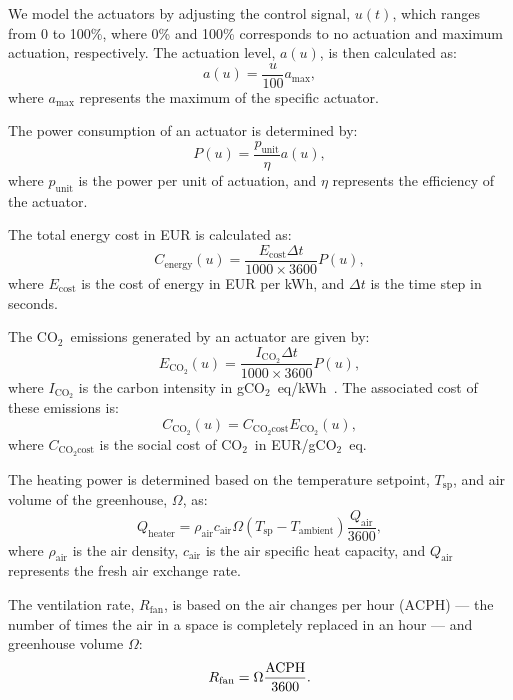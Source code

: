 \documentclass[conference]{IEEEtran}
\newcommand{\coo}{\ensuremath{\mathrm{CO_2}}}
\begin{document}
We model the actuators by adjusting the control signal, \( u(t) \), which ranges from 0 to 100\%, where 0\% and 100\% corresponds to no actuation and maximum actuation, respectively. The actuation level, \( a(u) \), is then calculated as:
\begin{equation}
    a(u) = \frac{u}{100}  a_{\text{max}},
\end{equation}
where \( a_{\text{max}} \) represents the maximum of the specific actuator.

The power consumption of an actuator is determined by:
\begin{equation}
    P(u) = \frac{p_{\text{unit}}}{\eta}  a(u),
\end{equation}
where \( p_{\text{unit}} \) is the power per unit of actuation, and \( \eta \) represents the efficiency of the actuator.

The total energy cost in EUR is calculated as:
\begin{equation}
    C_{\text{energy}}(u) = \frac{E_{\text{cost}}  \Delta t}{1000 \times 3600}  P(u),
\end{equation}
where \( E_{\text{cost}} \) is the cost of energy in EUR per kWh, and \( \Delta t \) is the time step in seconds.

The \coo\ emissions generated by an actuator are given by:
\begin{equation}
    E_{\coo}(u) = \frac{I_{\coo}  \Delta t}{1000 \times 3600}  P(u),
\end{equation}
where \( I_{\coo} \) is the carbon intensity in g\coo\ eq/kWh~\cite{ElectricityMaps2022}. The associated cost of these emissions is:
\begin{equation}
    C_{\coo}(u) = C_{\coo\text{cost}}  E_{\coo}(u),
\end{equation}
where \( C_{\coo\text{cost}} \) is the social cost of \coo\ in EUR/g\coo\ eq.

The heating power is determined based on the temperature setpoint, \( T_{\text{sp}} \), and air volume of the greenhouse, \( \Omega \), as:
\begin{equation}
    Q_{\text{heater}} = \rho_{\text{air}}  c_{\text{air}}  \Omega  (T_{\text{sp}} - T_{\text{ambient}})  \frac{Q_{\text{air}}}{3600},
\end{equation}
where \( \rho_{\text{air}} \) is the air density, \( c_{\text{air}} \) is the air specific heat capacity, and \( Q_{\text{air}} \) represents the fresh air exchange rate.

The ventilation rate, \( R_{\text{fan}} \), is based on the air changes per hour (\( \text{ACPH} \)) --- the number of times the air in a space is completely replaced in an hour --- and greenhouse volume \( \Omega \):
\begin{equation}
    R_{\text{fan}} = \Omega \frac{\text{\( \text{ACPH} \)}}{3600}.
\end{equation}
\end{document}
